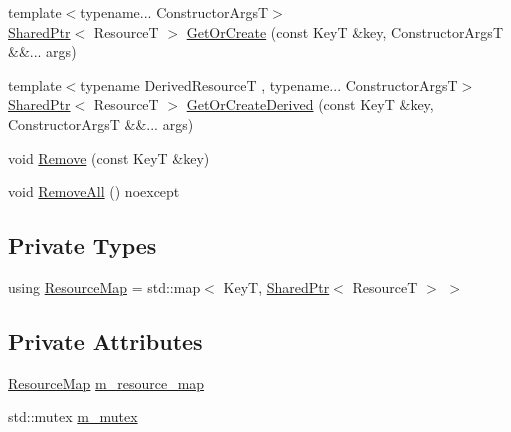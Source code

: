 \begin{DoxyCompactItemize}
\item 
{\footnotesize template$<$typename... Constructor\+ArgsT$>$ }\\\mbox{\hyperlink{namespacemage_a1e01ae66713838a7a67d30e44c67703e}{Shared\+Ptr}}$<$ ResourceT $>$ \mbox{\hyperlink{classmage_1_1_persistent_resource_pool_a009e1629ff0b1aab01a1b0483c6e1e64}{Get\+Or\+Create}} (const KeyT \&key, Constructor\+ArgsT \&\&... args)
\item 
{\footnotesize template$<$typename Derived\+ResourceT , typename... Constructor\+ArgsT$>$ }\\\mbox{\hyperlink{namespacemage_a1e01ae66713838a7a67d30e44c67703e}{Shared\+Ptr}}$<$ ResourceT $>$ \mbox{\hyperlink{classmage_1_1_persistent_resource_pool_ac9331d02b4cd63459e6d96e427f4b627}{Get\+Or\+Create\+Derived}} (const KeyT \&key, Constructor\+ArgsT \&\&... args)
\item 
void \mbox{\hyperlink{classmage_1_1_persistent_resource_pool_ae340b1445a0c362155926ab1d0e752b0}{Remove}} (const KeyT \&key)
\item 
void \mbox{\hyperlink{classmage_1_1_persistent_resource_pool_acc77e3a19140fd6c758f6d4f6a961466}{Remove\+All}} () noexcept
\end{DoxyCompactItemize}
\subsection*{Private Types}
\begin{DoxyCompactItemize}
\item 
using \mbox{\hyperlink{classmage_1_1_persistent_resource_pool_a9215c5816fc45ab5f772625df2a8a60c}{Resource\+Map}} = std\+::map$<$ KeyT, \mbox{\hyperlink{namespacemage_a1e01ae66713838a7a67d30e44c67703e}{Shared\+Ptr}}$<$ ResourceT $>$ $>$
\end{DoxyCompactItemize}
\subsection*{Private Attributes}
\begin{DoxyCompactItemize}
\item 
\mbox{\hyperlink{classmage_1_1_persistent_resource_pool_a9215c5816fc45ab5f772625df2a8a60c}{Resource\+Map}} \mbox{\hyperlink{classmage_1_1_persistent_resource_pool_a9fec1e7492b5aea2a006b4e150289795}{m\+\_\+resource\+\_\+map}}
\item 
std\+::mutex \mbox{\hyperlink{classmage_1_1_persistent_resource_pool_ac62c20842345306be0cddda2cb0d0524}{m\+\_\+mutex}}
\end{DoxyCompactItemize}


